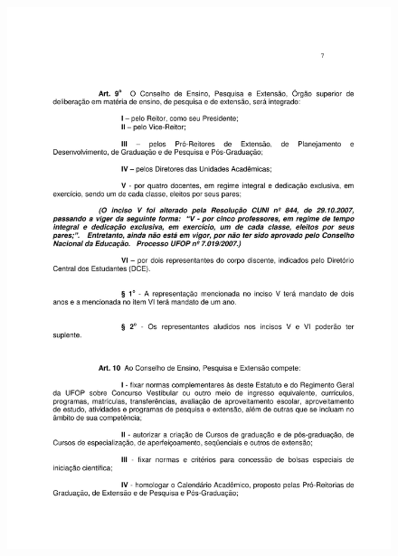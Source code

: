 \begin{figure}[p]
	\centering 
	\includegraphics[scale=0.7]{capitulos/resolucoes/cuni414/cuni414-7.pdf}
\end{figure} \pagebreak

